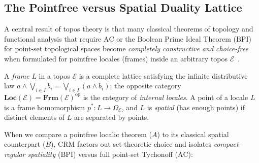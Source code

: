 \documentclass[10pt,twoside,openright]{book}
\theoremstyle{crmplain}
\theoremstyle{crmdef}
\theoremstyle{crmremark}
\begin{document}
\subsection{The Pointfree versus Spatial Duality Lattice}

A central result of topos theory is that many classical theorems of topology and functional analysis that require $\mathrm{AC}$ or the Boolean Prime Ideal Theorem ($\mathrm{BPI}$) for point-set topological spaces become \emph{completely constructive and choice-free} when formulated for pointfree locales (frames) inside an arbitrary topos $\mathcal{E}$~\cite{Johnstone82}.

A \emph{frame} $L$ in a topos $\mathcal{E}$ is a complete lattice satisfying the infinite distributive law $a \wedge \bigvee_{i \in I} b_i = \bigvee_{i \in I} (a \wedge b_i)$; the opposite category $\mathbf{Loc}(\mathcal{E}) = \mathbf{Frm}(\mathcal{E})^{\mathrm{op}}$ is the category of \emph{internal locales}. A point of a locale $L$ is a frame homomorphism $p^*: L \to \Omega_{\mathcal{E}}$, and $L$ is \emph{spatial} (has enough points) if distinct elements of $L$ are separated by points.

When we compare a pointfree localic theorem ($A$) to its classical spatial counterpart ($B$), $\mathrm{CRM}$ factors out set-theoretic choice and isolates \emph{compact-regular spatiality} ($\mathrm{BPI}$) versus full point-set Tychonoff ($\mathrm{AC}$):
\end{document}
